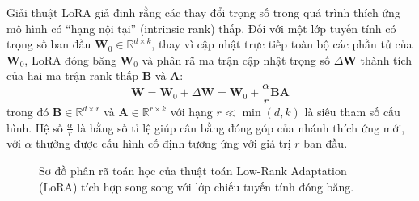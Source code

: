 Giải thuật LoRA giả định rằng các thay đổi trọng số trong quá trình thích ứng mô hình có ``hạng nội tại'' (intrinsic rank) thấp. Đối với một lớp tuyến tính có trọng số ban đầu $\mathbf{W}_0 \in \mathbb{R}^{d \times k}$, thay vì cập nhật trực tiếp toàn bộ các phần tử của $\mathbf{W}_0$, LoRA đóng băng $\mathbf{W}_0$ và phân rã ma trận cập nhật trọng số $\Delta \mathbf{W}$ thành tích của hai ma trận rank thấp $\mathbf{B}$ và $\mathbf{A}$:
\begin{equation}
    \mathbf{W} = \mathbf{W}_0 + \Delta \mathbf{W} = \mathbf{W}_0 + \frac{\alpha}{r} \mathbf{B}\mathbf{A}
\end{equation}
trong đó $\mathbf{B} \in \mathbb{R}^{d \times r}$ và $\mathbf{A} \in \mathbb{R}^{r \times k}$ với hạng $r \ll \min(d, k)$ là siêu tham số cấu hình. Hệ số $\frac{\alpha}{r}$ là hằng số tỉ lệ giúp cân bằng đóng góp của nhánh thích ứng mới, với $\alpha$ thường được cấu hình cố định tương ứng với giá trị $r$ ban đầu.

\begin{figure}[htbp]
    \centering
    \caption{Sơ đồ phân rã toán học của thuật toán Low-Rank Adaptation (LoRA) tích hợp song song với lớp chiếu tuyến tính đóng băng.}
    \label{fig:lora_architecture}
\end{figure}

